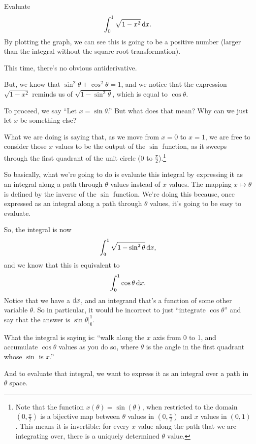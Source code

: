 \begin{example}
  Evaluate
  \begin{align*}
     \int _{0}^{1} \sqrt {1-x^{2}} \dx.
  \end{align*}
  By plotting the graph, we can see this is going to be a positive number (larger than the integral
  without the square root transformation).

  This time, there's no obvious antiderivative.

  But, we know that $\sin^2 \theta + \cos^2 \theta = 1$, and we notice that the expression
  $\sqrt{1 - x^2}$ reminds us of $\sqrt{1 - \sin^2 \theta}$, which is equal to $\cos \theta$.

  To proceed, we say ``Let $x = \sin \theta$.'' But what does that mean? Why can we just let $x$ be something else?
  
  What we are doing is saying that, as we move from $x=0$ to $x = 1$, we are free to consider those
  $x$ values to be the output of the $\sin$ function, as it sweeps through the first quadrant of the
  unit circle ($0$ to $\frac{\pi}{2}$).\footnote{Note that the function $x(\theta) = \sin(\theta)$, when restricted to the domain
  $(0, \frac{\pi}{2})$ is a bijective map between $\theta$ values in $(0, \frac{\pi}{2})$ and $x$ values in
  $(0, 1)$. This means it is invertible: for every $x$ value along the path that we are integrating
  over, there is a uniquely determined $\theta$ value.}

  So basically, what we're going to do is evaluate this integral by expressing it as an integral along
  a path through $\theta$ values instead of $x$ values. The mapping $x \mapsto \theta$ is defined by the inverse of the
  $\sin$ function. We're doing this because, once expressed as an integral along a path through
  $\theta$ values, it's going to be easy to evaluate.

  So, the integral is now
  \begin{align*}
     \int _{0}^{1} \sqrt {1-\sin^{2} \theta} \dx,
  \end{align*}
  and we know that this is equivalent to
  \begin{align*}
     \int _{0}^{1} \cos \theta \dx.
  \end{align*}
  Notice that we have a $\dx$, and an integrand that's a function of some other variable $\theta$. So in
  particular, it would be incorrect to just ``integrate $\cos \theta$'' and say that the answer is
  $\sin \theta\Big|_0^1$.

  What the integral is saying is: ``walk along the $x$ axis from 0 to 1, and accumulate $\cos \theta$ values as
  you do so, where $\theta$ is the angle in the first quadrant whose $\sin$ is $x$.''

  And to evaluate that integral, we want to express it as an integral over a path in $\theta$ space.

\end{example}

